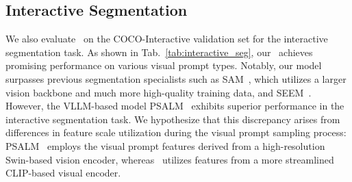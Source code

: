 \begin{table}[ht]
    \centering
    \caption{Quantitative results of our \name~on Multi-modal question answering benchmarks. \name~achieves promising performance compared with previous VLLMs in several widely used Multi-modal benchmarks.}
    
    \label{tab:mllm_results}
\end{table}

\subsection{Interactive Segmentation}

We also evaluate \name~on the COCO-Interactive validation set for the interactive segmentation task. As shown in Tab.~\ref{tab:interactive_seg}, our \name~achieves promising performance on various visual prompt types. 
Notably, our model surpasses previous segmentation specialists such as SAM~\cite{kirillov2023segment}, which utilizes a larger vision backbone and much more high-quality training data, and SEEM~\cite{seem}. 
However, the VLLM-based model PSALM~\cite{zhang2024psalm} exhibits superior performance in the interactive segmentation task. 
We hypothesize that this discrepancy arises from differences in feature scale utilization during the visual prompt sampling process: PSALM~\cite{zhang2024psalm} employs the visual prompt features derived from a high-resolution Swin-based vision encoder, whereas \name~utilizes features from a more streamlined CLIP-based visual encoder.


